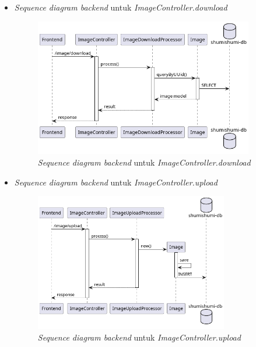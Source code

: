 \documentclass[a4paper]{article}
\begin{document}
\begin{enumerate}
\begin{enumerate}
\begin{itemize}
            \newpage
            \item \textit{Sequence diagram backend} untuk \textit{ImageController.download}
            \begin{figure}[h]
                \centering
                \includegraphics*[height=6cm]{diagram/sequence diagram/BE/image controller/download/download.png}
                \caption{\textit{Sequence diagram backend} untuk \textit{ImageController.download}}
            \end{figure}

            \item \textit{Sequence diagram backend} untuk \textit{ImageController.upload}
            \begin{figure}[h]
                \centering
                \includegraphics*[height=6cm]{diagram/sequence diagram/BE/image controller/upload/upload.png}
                \caption{\textit{Sequence diagram backend} untuk \textit{ImageController.upload}}
            \end{figure}


\end{itemize}
\end{enumerate}
\end{enumerate}
\end{document}
